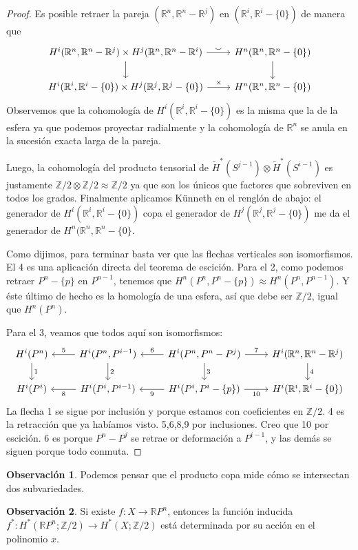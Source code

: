 \documentclass[spanish]{book}
\theoremstyle{definition}
\newtheorem*{obs}{Observación}
\newcommand{\R}{\mathbb{R}}
\newcommand{\Z}{\mathbb{Z}}
\begin{document}
\begin{proof}
	Es posible retraer la pareja $(\R^n,\R^n-\R^j)$ en $(\R^i,\R^i-\{0\})$ de manera que
	\[\begin{tikzcd}
		H^i(\R^n,\R^n-\R^j)\times H^j(\R^n,\R^n-\R^i)\arrow[r,"\smile"]\arrow[d]&H^n(\R^n,\R^n-\{0\})\arrow[d]\\
		H^i(\R^i,\R^i-\{0\})\times H^j(\R^j,\R^j-\{0\})\arrow[r,"\times"]&H^n(\R^n,\R^n-\{0\})
	\end{tikzcd}\]
	Observemos que la cohomología de $H^i(\R^i,\R^i-\{0\})$ es la misma que la de la esfera ya que podemos proyectar radialmente y la cohomología de $\R^n$ se anula en la sucesión exacta larga de la pareja.
	
	Luego, la cohomología del producto tensorial de $\tilde{H}^*(S^{j-1})\otimes \tilde{H}^*(S^{i-1})$ es justamente $\Z/2\otimes\Z/2\approx\Z/2$ ya que son los únicos que factores que sobreviven en todos los grados. Finalmente aplicamos Künneth en el renglón de abajo: el generador de $H^i(\R^i,\R^i-\{0\})$ copa el generador de $H^j(\R^j,\R^j-\{0\})$ me da el generador de $H^n(\R^n,\R^n-\{0\}$.
	
	Como dijimos, para terminar basta ver que las flechas verticales son isomorfismos. El 4 es una aplicación directa del teorema de escición. Para el 2, como podemos retraer $P^n-\{p\}$ en $P^{n-1}$, tenemos que $H^n(P^n,P^n-\{p\})\approx H^n(P^n,P^{n-1})$. Y éste último de hecho es la homología de una esfera, así que debe ser $\Z/2$, igual que $H^n(P^n)$.
	
	Para el 3, veamos que todos aquí son isomorfismos:
	\[\begin{tikzcd}
		H^i(P^n)\arrow[d,"1"]&H^i(P^n,P^{i-1})\arrow[l,"5",swap]\arrow[d,"2"]&H^i(P^n,P^n-P^j)\arrow[r,"7"]\arrow[d,"3"]\arrow[l,"6",swap]&H^i(\R^n,\R^n-\R^j)\arrow[d,"4"]\\
		H^i(P^i)&H^i(P^i,P^{i-1})\arrow[l,"8"]&H^i(P^i,P^i-\{p\})\arrow[l,"9"]\arrow[r,"10",swap]&H^i(\R^i,\R^i-\{0\})
	\end{tikzcd}\]
	La flecha 1 se sigue por inclusión y porque estamos con coeficientes en $\Z/2$. 4 es la retracción que ya habíamos visto. 5,6,8,9 por inclusiones. Creo que 10 por escición. 6 es porque $P^n-P^j$ se retrae or deformación a $P^{i-1}$, y las demás se siguen porque todo conmuta.
\end{proof}
\begin{obs}
	Podemos pensar que el producto copa mide cómo se intersectan dos subvariedades.
\end{obs}
\begin{obs}
	Si existe $f:X\to\R P^n$, entonces la función inducida $f^*:H^*(\R P^n;\Z/2)\to H^*(X;\Z/2)$ está determinada por su acción en el polinomio $x$.
\end{obs}
\end{document}
